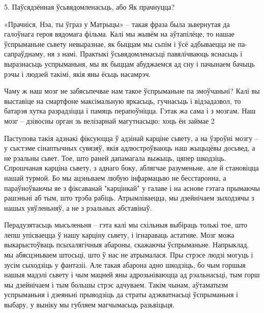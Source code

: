 5. Паўсядзённая ўсьвядомленасьць, або Як прачнуцца?

«Прачніся, Нэа, ты ўграз у Матрыцы» – такая фраза была зьвернутая да галоўнага героя вядомага фільма. Калі мы жывём на аўтапілёце, то нашае ўспрыманьне сьвету невыразнае, як быццам мы сьпім і ўсё адбываецца не па-сапраўднаму, ня з намі. Практыкі ўсьвядомленасьці павялічваюць яснасьць і выразнасьць успрыманьня, мы як быццам абуджаемся ад сну і пачынаем бачыць рэчы і людзей такімі, якія яны ёсьць насамрэч.

Чаму ж наш мозг не забясьпечвае нам такое ўспрыманьне па змоўчаньні? Калі вы выставіце на смартфоне максімальную яркасьць, гучнасьць і відэадазвол, то батарэя хутка разрадзіцца і памяць перапоўніцца. Гэтак жа сама і з мозгам. Наш мозг – дзівосны орган зь велізарнай магутнасьцю: хоць ён займае 2%

Паступова такія адзнакі фіксуюцца ў адзінай карціне сьвету, а на ўзроўні мозгу – у сыстэме сінаптычных сувязяў, якія адлюстроўваюць наш жыцьцёвы досьвед, а не рэальны сьвет. Тое, што раней дапамагала выжыць, цяпер шкодзіць. Спрошчаная карціна сьвету, з аднаго боку, аблягчае разуменьне, але й становіцца нашай турмой. Бо мы ацэньваем любую інфармацыю не бесстаронна, а параўноўваючы яе з фіксаванай "карцінкай" у галаве і на аснове гэтага прымаючы рашэньні аб тым, што трэба рабіць. Атрымліваецца, мы дзейнічаем зыходзячы з нашых уяўленьняў, а не з рэальных абставінаў.

Перадузятасьць мысьленьня – гэта калі мы схільныя выбіраць толькі тое, што лепш упісваецца ў нашу карціну сьвету, і ігнараваць астатняе. Мозг можа выкарыстоўваць псыхалягічныя абароны, скажаючы ўспрыманьне. Напрыклад, мы абясцэньваем штосьці, што ў нас не атрымалася. Пры стрэсе людзі могуць і зусім сыходзіць у фантазіі. Але такая абарона адно шкодзіць, бо чым горшыя нашыя мадэлі сьвету і чым мацней яны адрозьніваюцца ад рэальнасьці, тым горш мы дзейнічаем і тым большы стрэс адчуваем. Такім чынам, аўтаматызм успрыманьня і дзеяньні прыводзіць да страты адэкватнасьці ўспрыманьня і выбару, у выніку мы губляем магчымасьць разьвіцьця.

